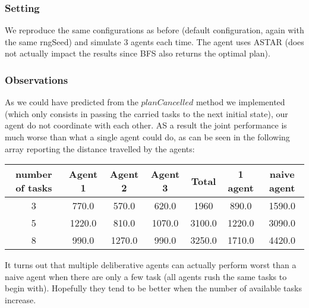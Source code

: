\documentclass[11pt]{article}
\begin{document}
\subsubsection{Setting}
We reproduce the same configurations as before (default configuration, again with the same rngSeed) and simulate 3 agents each time. The agent uses ASTAR (does not actually impact the results since BFS also returns the optimal plan).

\subsubsection{Observations}

As we could have predicted from the $planCancelled$ method we implemented (which only consists in passing the carried tasks to the next initial state), our agent do not coordinate with each other. AS a result the joint performance is much worse than what a single agent could do, as can be seen in the following array reporting the distance travelled by the agents: 

\begin{tabular}{|c|c|c|c|c|c|c|}
\hline 
number of tasks & Agent 1 & Agent 2 & Agent 3 & Total & 1 agent & naive agent \\ 
\hline 
3 & 770.0 & 570.0 & 620.0 & 1960 & 890.0 & 1590.0\\ 
\hline 
5 & 1220.0 & 810.0 & 1070.0 & 3100.0 & 1220.0 & 3090.0\\ 
\hline 
8 & 990.0 & 1270.0 & 990.0 & 3250.0 & 1710.0 & 4420.0\\ 
\hline 
\end{tabular} 

It turns out that multiple deliberative agents can actually perform worst than a naive agent when there are only a few task (all agents rush the same tasks to begin with). Hopefully they tend to be better when the number of available tasks increase. 
\end{document}
